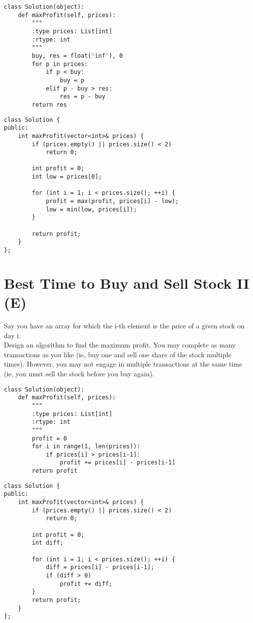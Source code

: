 \begin{lstlisting}
class Solution(object):
    def maxProfit(self, prices):
        """
        :type prices: List[int]
        :rtype: int
        """
        buy, res = float('inf'), 0
        for p in prices:
            if p < buy: 
                buy = p
            elif p - buy > res:
                res = p - buy
        return res
\end{lstlisting}

\begin{lstlisting}
class Solution {
public:
    int maxProfit(vector<int>& prices) {
        if (prices.empty() || prices.size() < 2)
            return 0;
        
        int profit = 0;
        int low = prices[0];
        
        for (int i = 1; i < prices.size(); ++i) {
            profit = max(profit, prices[i] - low);
            low = min(low, prices[i]);
        }
        
        return profit;
    }
};
\end{lstlisting}


\section{Best Time to Buy and Sell Stock II (E)}
Say you have an array for which the i-th element is the price of a given stock on day i. \\

Design an algorithm to find the maximum profit. You may complete as many transactions as you like (ie, buy one and sell one share of the stock multiple times). However, you may not engage in multiple transactions at the same time (ie, you must sell the stock before you buy again). \\

\begin{lstlisting}
class Solution(object):
    def maxProfit(self, prices):
        """
        :type prices: List[int]
        :rtype: int
        """
        profit = 0
        for i in range(1, len(prices)):
            if prices[i] > prices[i-1]:
                profit += prices[i] - prices[i-1]
        return profit
\end{lstlisting}

\begin{lstlisting}
class Solution {
public:
    int maxProfit(vector<int>& prices) {
        if (prices.empty() || prices.size() < 2)
            return 0;
        
        int profit = 0;
        int diff;
        
        for (int i = 1; i < prices.size(); ++i) {
            diff = prices[i] - prices[i-1];
            if (diff > 0)
                profit += diff;
        }
        return profit;
    }
};
\end{lstlisting}


